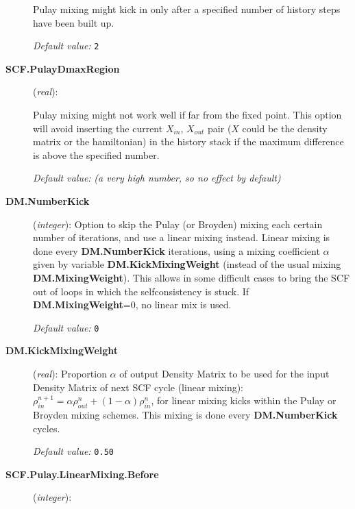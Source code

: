 \begin{description}
Pulay mixing might kick in only after a specified number of history
steps have been built up.

\textit{Default value:} \texttt{2}

\item[\textbf{SCF.PulayDmaxRegion}] (\textit{real}):

Pulay mixing might not work well if far from the fixed point. This option
will avoid inserting the current $X_{in}$, $X_{out}$ pair ($X$ could be
the density matrix or the hamiltonian) in the history stack if
the maximum difference is above the specified number.

\textit{Default value:} \textit{(a very high number, so no effect by
  default)}

\item[\textbf{DM.NumberKick}] (\textit{integer}):
Option to skip the Pulay (or Broyden) mixing each certain number of iterations,
and use a linear mixing instead. Linear mixing is done
every \textbf{DM.NumberKick} iterations, using a mixing coefficient
$\alpha$ given by variable \textbf{DM.KickMixingWeight}
(instead of the usual mixing \textbf{DM.MixingWeight}).
This allows in some difficult cases to bring the SCF out of
loops in which the selfconsistency is stuck.
If \textbf{DM.MixingWeight}=0, no linear mix is used.

\textit{Default value:} \texttt{0}

\item[\textbf{DM.KickMixingWeight}] (\textit{real}):
Proportion $\alpha$ of
output Density Matrix to be used for the input Density Matrix of
next SCF cycle (linear mixing):
$\rho^{n+1}_{in} = \alpha \rho^{n}_{out}
+(1 - \alpha) \rho^{n}_{in}$, for linear mixing kicks within the
Pulay or Broyden mixing schemes.
This mixing is done every \textbf{DM.NumberKick} cycles.

\textit{Default value:} \texttt{0.50}


\item[\textbf{SCF.Pulay.LinearMixing.Before}] (\textit{integer}):


\end{description}
